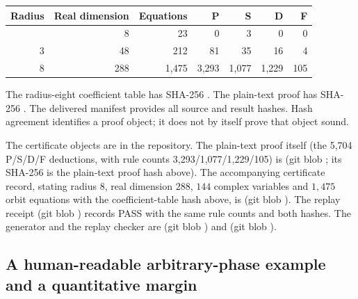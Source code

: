 \begin{longtable}[]{@{}rrrrrrr@{}}
\toprule\noalign{}
Radius & Real dimension & Equations & P & S & D & F \\
\midrule\noalign{}
\endhead
\bottomrule\noalign{}
\endlastfoot
1 & 8 & 23 & 0 & 3 & 0 & 0 \\
3 & 48 & 212 & 81 & 35 & 16 & 4 \\
8 & 288 & 1,475 & 3,293 & 1,077 & 1,229 & 105 \\
\end{longtable}

The radius-eight coefficient table has SHA-256 . The plain-text proof has SHA-256 . The delivered manifest provides all source and result hashes. Hash agreement identifies a proof object; it does not by itself prove that object sound.

The certificate objects are in the repository. The plain-text proof itself
(the 5,704 P/S/D/F deductions, with rule counts 3,293/1,077/1,229/105) is
(git blob ; its SHA-256 is
the plain-text proof hash above). The accompanying certificate record,
stating radius $8$, real dimension $288$, $144$ complex variables and
$1{,}475$ orbit equations with the coefficient-table hash above, is
(git blob ). The replay
receipt
(git blob ) records PASS
with the same rule counts and both hashes. The generator and the replay
checker are 
(git blob ) and
(git blob ).

\subsection{A human-readable arbitrary-phase example and a quantitative margin}\label{nondegeneracy:a-human-readable-arbitrary-phase-example-and-a-quantitative-margin}

